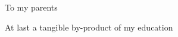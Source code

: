 \cleardoublepage
\thispagestyle{empty}
{}

\vspace*{3cm}

\begin{center}
    To my parents
\end{center}

\medskip

\begin{center}
    At last a tangible by-product of my education
\end{center}
